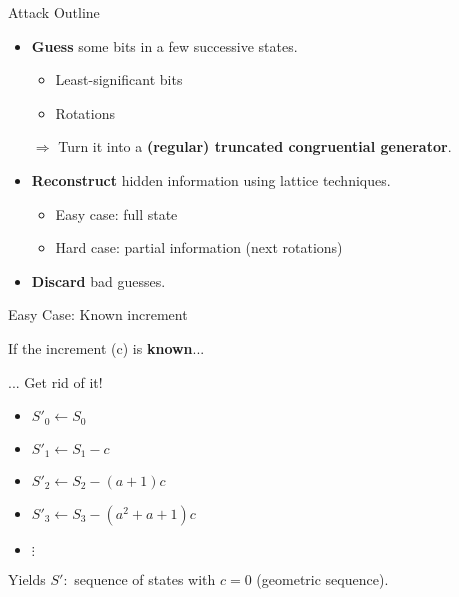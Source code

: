 \begin{frame}{Attack Outline}

\begin{itemize}
    \item \textbf{Guess} some bits in a few successive states.
    \begin{itemize}
          \item<2-> Least-significant bits
          \item<2-> Rotations
    \end{itemize}
      
    \medskip
      
    \item[$\Rightarrow$] Turn it into a \textbf{(regular) truncated congruential generator}.
      
    \medskip

    \item \textbf{Reconstruct} hidden information using lattice techniques.
    \begin{itemize}
          \item<3-> Easy case: full state
          \item<3-> Hard case: partial information (next rotations)
      \end{itemize}
    
    \medskip
    
    \item \textbf{Discard} bad guesses.
\end{itemize}
\end{frame}



\begin{frame}{Easy Case: Known increment}

If the \alert{increment} (\alert{c}) is \textbf{known}...

\bigskip

\begin{exampleblock}{... Get rid of it!}
\begin{itemize}
    \item $S'_0 \gets S_0$
    \item $S'_1 \gets S_1 - c$
    \item $S'_2 \gets S_2 - (a+1)c$
    \item $S'_3 \gets S_3 - (a^2 + a + 1)c$
    \item $\vdots$
\end{itemize}
\end{exampleblock}

\bigskip

Yields $S' :$ sequence of states with $c=0$ (geometric sequence).

\end{frame}



